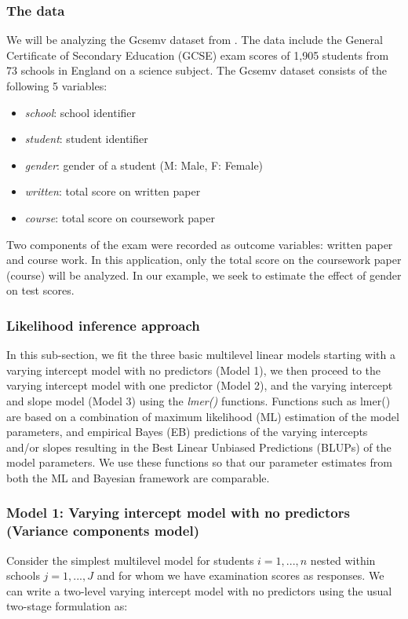 \subsubsection{The data}
We will be analyzing the Gcsemv dataset from \cite{rasbash2000user}. The data include the General Certificate of Secondary Education (GCSE) exam scores of 1,905 students from 73 schools in England on a science subject. The Gcsemv dataset consists of the following 5 variables:
\begin{itemize}
	\item \textit{school}: school identifier
	\item \textit{student}: student identifier
	\item \textit{gender}: gender of a student (M: Male, F: Female)
	\item \textit{written}: total score on written paper
	\item \textit{course}: total score on coursework paper
\end{itemize}
Two components of the exam were recorded as outcome variables: written paper and course work. In this application, only the total score on the coursework paper (course) will be analyzed. In our example, we seek to estimate the effect of gender on test scores.

\subsubsection{Likelihood inference approach}
In this sub-section, we fit the three basic multilevel linear models starting with a varying intercept model with no predictors (Model 1), we then proceed to the varying intercept model with one predictor (Model 2), and the varying intercept and slope model (Model 3) using the \textit{lmer()} functions. Functions such as lmer() are based on a combination of maximum likelihood (ML) estimation of the model parameters, and empirical Bayes (EB) predictions of the varying intercepts and/or slopes resulting in the Best Linear Unbiased Predictions (BLUPs) of the model parameters. We use these functions so that our parameter estimates from both the ML and Bayesian framework are comparable.

\subsubsection*{Model 1: Varying intercept model with no predictors (Variance components model)}

Consider the simplest multilevel model for students $i=1,...,n$ nested within schools $j=1,...,J$ and for whom we have examination scores as responses. We can write a two-level varying intercept model with no predictors using the usual two-stage formulation as:

